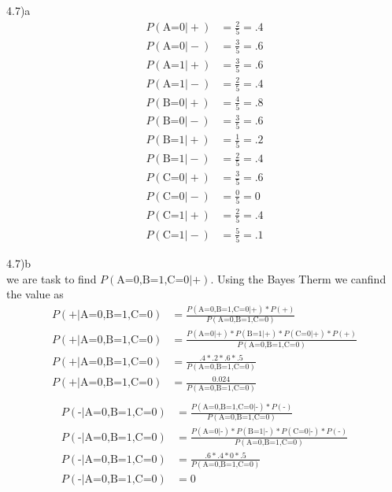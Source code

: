 \documentclass[12pt,english]{article}
\begin{document}
4.7)a\\
\begin{equation}
\begin{split}
P(\mbox{A=0} \vert +) &= \frac{2}{5} = .4\\
P(\mbox{A=0} \vert -) &= \frac{3}{5} = .6\\
P(\mbox{A=1} \vert +) &= \frac{3}{5} = .6\\
P(\mbox{A=1} \vert -) &= \frac{2}{5} = .4\\
P(\mbox{B=0} \vert +) &= \frac{4}{5} = .8\\
P(\mbox{B=0} \vert -) &= \frac{3}{5} = .6\\
P(\mbox{B=1} \vert +) &= \frac{1}{5} = .2\\
P(\mbox{B=1} \vert -) &= \frac{2}{5} = .4\\
P(\mbox{C=0} \vert +) &= \frac{3}{5} = .6\\
P(\mbox{C=0} \vert -) &= \frac{0}{5} = 0\\
P(\mbox{C=1} \vert +) &= \frac{2}{5} = .4\\
P(\mbox{C=1} \vert -) &= \frac{5}{5} = .1
\end{split}
\end{equation}
\par
4.7)b\\
we are task to find $P(\mbox{A=0,B=1,C=0} \vert \mbox{+})$. Using the Bayes Therm we canfind the value as
\begin{equation}
\begin{split}
P(\mbox{+} \vert \mbox{A=0,B=1,C=0}) &= \frac{P(\mbox{A=0,B=1,C=0} \vert \mbox{+}) * P(\mbox{+})}{P(\mbox{A=0,B=1,C=0})}\\
P(\mbox{+} \vert \mbox{A=0,B=1,C=0}) &= \frac{P(\mbox{A=0} \vert \mbox{+}) * P(\mbox{B=1} \vert \mbox{+}) *P(\mbox{C=0} \vert \mbox{+}) * P(\mbox{+})}{P(\mbox{A=0,B=1,C=0})}\\
P(\mbox{+} \vert \mbox{A=0,B=1,C=0}) &= \frac{.4 * .2 *.6 * .5}{P(\mbox{A=0,B=1,C=0})}\\
P(\mbox{+} \vert \mbox{A=0,B=1,C=0}) &= \frac{0.024}{P(\mbox{A=0,B=1,C=0})}\\
\end{split}
\end{equation}
\begin{equation}
\begin{split}
P(\mbox{-} \vert \mbox{A=0,B=1,C=0}) &= \frac{P(\mbox{A=0,B=1,C=0} \vert \mbox{-}) * P(\mbox{-})}{P(\mbox{A=0,B=1,C=0})}\\
P(\mbox{-} \vert \mbox{A=0,B=1,C=0}) &= \frac{P(\mbox{A=0} \vert \mbox{-}) * P(\mbox{B=1} \vert \mbox{-}) *P(\mbox{C=0} \vert \mbox{-}) * P(\mbox{-})}{P(\mbox{A=0,B=1,C=0})}\\
P(\mbox{-} \vert \mbox{A=0,B=1,C=0}) &= \frac{.6 * .4 *0 * .5}{P(\mbox{A=0,B=1,C=0})}\\
P(\mbox{-} \vert \mbox{A=0,B=1,C=0}) &= 0\\
\end{split}
\end{equation}
\end{document}
